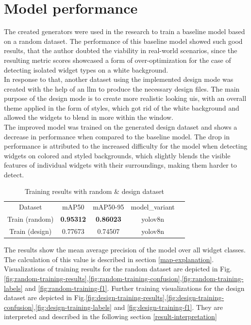 \documentclass[Bachelor, BIC, english, fhCitStyle, IEEE]{BASE/twbook} %
\begin{document}
\section{Model performance}
The created generators were used in the research to train a baseline model based on a random dataset. The performance of this baseline model showed such good results, that the author doubted the viability in real-world scenarios, since the resulting metric scores showcased a form of over-optimization for the case of detecting isolated widget types on a white background.\\
In response to that, another dataset using the implemented design mode was created with the help of an \ac{llm} to produce the necessary design files. The main purpose of the design mode is to create more realistic looking \acp{ui}, with an overall theme applied in the form of styles, which got rid of the white background and allowed the widgets to blend in more within the window.\\
The improved model was trained on the generated design dataset and shows a decrease in performance when compared to the baseline model. The drop in performance is attributed to the increased difficulty for the model when detecting widgets on colored and styled backgrounds, which slightly blends the visible features of individual widgets with their surroundings, making them harder to detect.
\begin{table}[H]
    \centering
    \begin{tabular}{c|c|c|c|c}
         Dataset & mAP50 & mAP50-95 & model\_variant \\
         Train (random) & \textbf{0.95312} & \textbf{0.86023} & yolov8n \\
         Train (design) & 0.77673 & 0.74507 & yolov8n
    \end{tabular}
    \caption{Training results with random \& design dataset}
    \label{tab:overall-training-results}
\end{table}
\noindent
The results show the mean average precision of the model over all widget classes. The calculation of this value is described in section \ref{map-explanation}.
Visualizations of training results for the random dataset are depicted in Fig.\ref{fig:random-training-results},\ref{fig:random-training-confusion},\ref{fig:random-training-labels} and \ref{fig:random-training-f1}.
Further training visualizations for the design dataset are depicted in Fig.\ref{fig:design-training-results},\ref{fig:design-training-confusion},\ref{fig:design-training-labels} and \ref{fig:design-training-f1}. They are interpreted and described in the following section \ref{result-interpretation}
\end{document}
